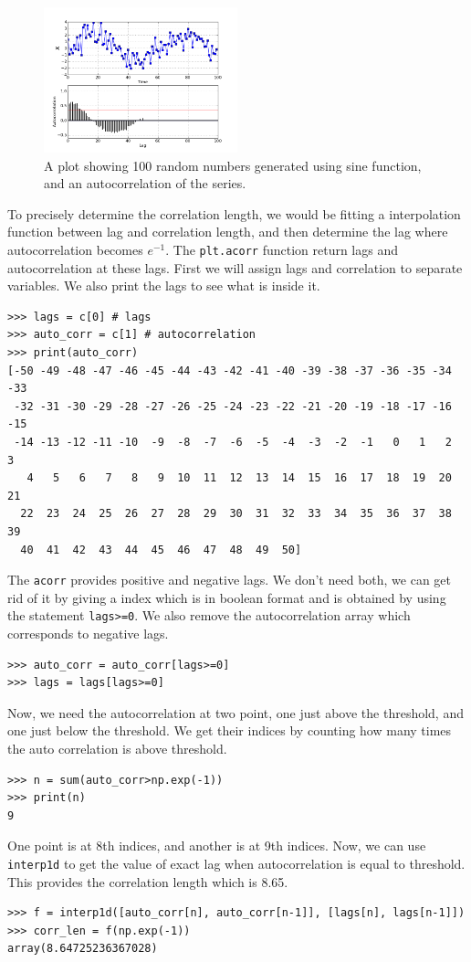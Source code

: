 \documentclass[10pt]{book}
\begin{document}
{\beforefig
\begin{figure}[h!]
  \centering
    \includegraphics[width=0.5\textwidth]{images/corr_1.png}
  \caption{A plot showing 100 random numbers generated using sine function, and an autocorrelation of the series.}
   \label{fig:corr_1}
\end{figure}
\afterfig

To precisely determine the correlation length, we would be fitting a interpolation function between lag and correlation length, and then determine the lag where autocorrelation becomes $e^{-1}$. The \verb"plt.acorr" function return lags and autocorrelation at these lags. First we will assign lags and correlation to separate variables. We also print the lags to see what is inside it.

\beforeverb \begin{verbatim}
>>> lags = c[0] # lags
>>> auto_corr = c[1] # autocorrelation
>>> print(auto_corr)
[-50 -49 -48 -47 -46 -45 -44 -43 -42 -41 -40 -39 -38 -37 -36 -35 -34 -33
 -32 -31 -30 -29 -28 -27 -26 -25 -24 -23 -22 -21 -20 -19 -18 -17 -16 -15
 -14 -13 -12 -11 -10  -9  -8  -7  -6  -5  -4  -3  -2  -1   0   1   2   3
   4   5   6   7   8   9  10  11  12  13  14  15  16  17  18  19  20  21
  22  23  24  25  26  27  28  29  30  31  32  33  34  35  36  37  38  39
  40  41  42  43  44  45  46  47  48  49  50]
\end{verbatim} \afterverb

The \verb"acorr" provides positive and negative lags. We don't need both, we can get rid of it by giving a index which is in boolean format and is obtained by using the statement \verb"lags>=0". We also remove the autocorrelation array which corresponds to negative lags. 
\beforeverb \begin{verbatim}
>>> auto_corr = auto_corr[lags>=0]
>>> lags = lags[lags>=0]
\end{verbatim} \afterverb
Now, we need the autocorrelation at two point, one just above the threshold, and one just below the threshold. We get their indices by counting how many times the auto correlation is above threshold. 
\beforeverb \begin{verbatim}
>>> n = sum(auto_corr>np.exp(-1))
>>> print(n)
9
\end{verbatim} \afterverb
One point is at 8th indices, and another is at 9th indices. Now, we can use \verb"interp1d" to get the value of exact lag when autocorrelation is equal to threshold. This provides the correlation length which is 8.65.
\beforeverb \begin{verbatim}
>>> f = interp1d([auto_corr[n], auto_corr[n-1]], [lags[n], lags[n-1]])
>>> corr_len = f(np.exp(-1))
array(8.64725236367028)
\end{verbatim} \afterverb

}
\end{document}
